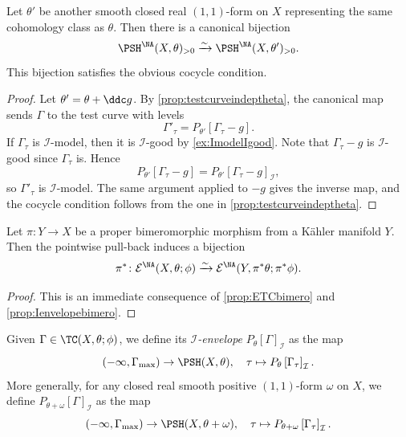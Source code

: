 \begin{proposition}\label{prop:Imodeltestcurveindeptheta}
    Let $\theta'$ be another smooth closed real $(1,1)$-form on $X$ representing the same cohomology class as $\theta$. Then there is a canonical bijection
    \[
    \PSH^{\NA}(X,\theta)_{>0}\xrightarrow{\sim} \PSH^{\NA}(X,\theta')_{>0}.
    \]
    This bijection satisfies the obvious cocycle condition.
\end{proposition}
\begin{proof}
    Let $\theta'=\theta+\ddc g$. By \cref{prop:testcurveindeptheta}, the canonical map sends $\Gamma$ to the test curve with levels
    \[
        \Gamma'_\tau=P_{\theta'}[\Gamma_\tau-g].
    \]
    If $\Gamma_\tau$ is $\mathcal I$-model, then it is $\mathcal I$-good by \cref{ex:ImodelIgood}. Note that $\Gamma_\tau-g$ is $\mathcal I$-good since $\Gamma_{\tau}$ is. Hence
    \[
        P_{\theta'}[\Gamma_\tau-g]=P_{\theta'}[\Gamma_\tau-g]_{\mathcal I},
    \]
    so $\Gamma'_\tau$ is $\mathcal I$-model. The same argument applied to $-g$ gives the inverse map, and the cocycle condition follows from the one in \cref{prop:testcurveindeptheta}.
\end{proof}


\begin{proposition}\label{prop:ETCIbimero}
    Let $\pi\colon Y\rightarrow X$ be a proper bimeromorphic morphism from a K\"ahler manifold $Y$. Then the pointwise pull-back induces a bijection
    \[
    \pi^*\colon \mathcal{E}^{\NA}(X,\theta;\phi)\xrightarrow{\sim} \mathcal{E}^{\NA}(Y,\pi^*\theta;\pi^*\phi).
    \]
\end{proposition}
\begin{proof}
    This is an immediate consequence of \cref{prop:ETCbimero} and \cref{prop:Ienvelopebimero}.
\end{proof}





\begin{definition}\label{def:TCIenvelope}
    Given $\Gamma\in \TC(X,\theta;\phi)$, we define its \emph{$\mathcal{I}$-envelope} $P_{\theta}[\Gamma]_{\mathcal{I}}$ as the map
    \[
        (-\infty,\Gamma_{\max})\rightarrow \PSH(X,\theta),\quad \tau\mapsto P_{\theta}\left[\Gamma_{\tau}\right]_{\mathcal{I}}.
    \]
        More generally, for any closed real smooth positive $(1,1)$-form $\omega$ on $X$, we define $P_{\theta+\omega}[\Gamma]_{\mathcal{I}}$ as the map
        \[
        (-\infty,\Gamma_{\max})\rightarrow \PSH(X,\theta+\omega),\quad \tau\mapsto P_{\theta+\omega}\left[\Gamma_{\tau}\right]_{\mathcal{I}}.
    \]
\end{definition}

